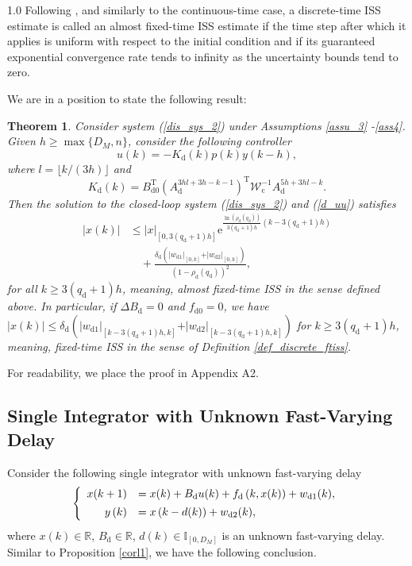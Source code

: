 \documentclass[journal]{IEEEtran}
\newtheorem{theorem}{Theorem}
\begin{document}
\begin{spacing}{1.0}
Following \cite{Mazenc24css}, and similarly to the continuous-time case, a
discrete-time ISS estimate is called an almost fixed-time ISS estimate if the
time step after which it applies is uniform with respect to the initial
condition and if its guaranteed exponential convergence rate tends to
infinity as the uncertainty bounds tend to zero.

We are in a position to state the following result:

\begin{theorem}
\label{the6}Consider system (\ref{dis_sys_2}) under Assumptions \ref{assu_3}%
-\ref{ass4}. Given $h\geq\max\{D_{M},n\}$, consider the following controller
\begin{equation}
u\left(  k\right)  =-K_{\mathrm{d}}(k)p\left(  k\right)  y\left(  k-h\right)
, \label{d_uu}%
\end{equation}
where $l=\lfloor k/(3h)\rfloor$ and
\[
K_{\mathrm{d}}(k)
=B_{\mathrm{d}0}^{\mathrm{T}}
(A_{\mathrm{d}}^{3hl+3h-k-1})^{\mathrm{T}}
\mathcal{W}_{\mathrm{c}}^{-1}
A_{\mathrm{d}}^{5h+3hl-k}.
\] Then the solution to the closed-loop system
(\ref{dis_sys_2}) and (\ref{d_uu}) satisfies
\begin{align}
|x(k)|
&\leq |x|_{[0,3(q_{\mathrm{d}}+1)h]}
\mathrm{e}^{\frac{\ln(\rho_{\mathrm{d}}(q_{\mathrm{d}}))}
{3(q_{\mathrm{d}}+1)h}(k-3(q_{\mathrm{d}}+1)h)}\nonumber\\
&\quad+\frac{\delta_{\mathrm{d}}(
\vert w_{\mathrm{d}1}\vert _{[0,k]}
+\vert w_{\mathrm{d}2}\vert _{[0,k]})}
{(1-\rho_{\mathrm{d}}(q_{\mathrm{d}}))^{2}},
\label{x_k_1}
\end{align}
for all $k\geq3(q_{\mathrm{d}}+1)h$, meaning, almost fixed-time ISS in the sense defined above. In particular, if $\mathit{\Delta}B_{\mathrm{d}}=0$ and
$f_{\mathrm{d}0}=0$, we have $|x(k)|\leq\delta_{\mathrm{d}}(\vert w_{\mathrm{d}1}\vert _{[k-3(q_{\mathrm{d}}+1)h,k]}
+\vert w_{\mathrm{d}2}\vert _{[k-3(q_{\mathrm{d}}+1)h,k]})$ for $k\geq3(q_{\mathrm{d}}+1)h$, meaning, fixed-time ISS in the
sense of Definition \ref{def_discrete_ftiss}.
\end{theorem}

For readability, we place the proof in Appendix A2.

\subsection{Single Integrator with Unknown Fast-Varying Delay}

Consider the following single integrator with unknown fast-varying delay
\begin{equation}
\left\{
\begin{array}
[c]{rl}%
x(k+1) & =x(k)+B_{\mathrm{d}}u(k)+f_{\mathrm{d}}\left(  k,x(k)\right)
+w_{\mathrm{d}1}(k),\\[1.5mm]%
y\left(  k\right)  & =x\left(  k-d(k)\right)  +w_{\mathrm{d}2}(k),
\end{array}
\right.  \label{scalar_d}%
\end{equation}
where $x(k)\in\mathbb{R}$, $B_{\mathrm{d}}\in\mathbb{R}$, $d(k)\in
\mathbb{I}_{[0,{D}_{{{M}}}]}$ is an unknown fast-varying delay. Similar to
Proposition \ref{corl1}, we have the following conclusion.


\end{spacing}
\end{document}
